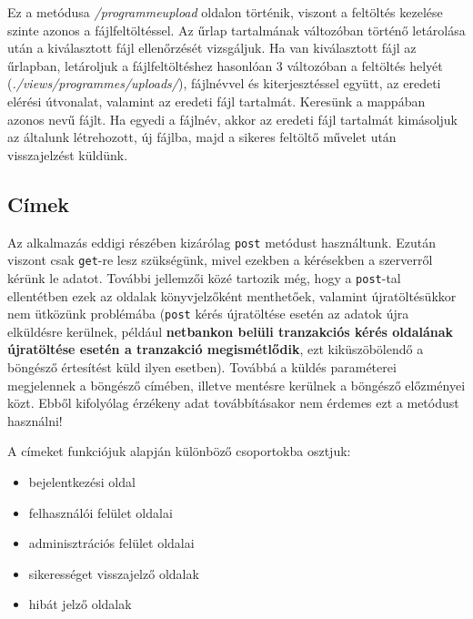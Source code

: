 Ez a metódusa \textit{/programmeupload} oldalon történik, viszont a feltöltés kezelése szinte azonos a fájlfeltöltéssel. Az űrlap tartalmának változóban történő letárolása után a kiválasztott fájl ellenőrzését vizsgáljuk. Ha van kiválasztott fájl az űrlapban, letároljuk a fájlfeltöltéshez hasonlóan 3 változóban a feltöltés helyét (\textit{./views/programmes/uploads/}), fájlnévvel és kiterjesztéssel együtt, az eredeti elérési útvonalat, valamint az eredeti fájl tartalmát. Keresünk a mappában azonos nevű fájlt. Ha egyedi a fájlnév, akkor az eredeti fájl tartalmát kimásoljuk az általunk létrehozott, új fájlba, majd a sikeres feltöltő művelet után visszajelzést küldünk.


\subsection{Címek}

Az alkalmazás eddigi részében kizárólag \texttt{post} metódust használtunk. Ezután viszont csak \texttt{get}-re lesz szükségünk, mivel ezekben a kérésekben a szerverről kérünk le adatot. További jellemzői közé tartozik még, hogy a \texttt{post}-tal ellentétben ezek az oldalak könyvjelzőként menthetőek, valamint újratöltésükkor nem ütközünk problémába (\texttt{post} kérés újratöltése esetén az adatok újra elküldésre kerülnek, például \textbf{netbankon belüli tranzakciós kérés oldalának újratöltése esetén a tranzakció megismétlődik}, ezt kiküszöbölendő a böngésző értesítést küld ilyen esetben). Továbbá a küldés paraméterei megjelennek a böngésző címében, illetve mentésre kerülnek a böngésző előzményei közt. Ebből kifolyólag érzékeny adat továbbításakor nem érdemes ezt a metódust használni!

A címeket funkciójuk alapján különböző csoportokba osztjuk:

\begin{itemize}
\item{bejelentkezési oldal}
\item{felhasználói felület oldalai}
\item{adminisztrációs felület oldalai}
\item{sikerességet visszajelző oldalak}
\item{hibát jelző oldalak}
\end{itemize}

\\

